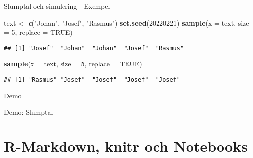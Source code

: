 \documentclass[
  11pt,
  ignorenonframetext,
  handout]{beamer}
\newenvironment{Shaded}{\begin{snugshade}}{\end{snugshade}}
\newcommand{\AttributeTok}[1]{\textcolor[rgb]{0.13,0.29,0.53}{#1}}
\newcommand{\ConstantTok}[1]{\textcolor[rgb]{0.56,0.35,0.01}{#1}}
\newcommand{\DecValTok}[1]{\textcolor[rgb]{0.00,0.00,0.81}{#1}}
\newcommand{\FunctionTok}[1]{\textcolor[rgb]{0.13,0.29,0.53}{\textbf{#1}}}
\newcommand{\NormalTok}[1]{#1}
\newcommand{\OtherTok}[1]{\textcolor[rgb]{0.56,0.35,0.01}{#1}}
\newcommand{\StringTok}[1]{\textcolor[rgb]{0.31,0.60,0.02}{#1}}
\begin{document}
\begin{frame}[fragile]{Slumptal och simulering - Exempel}
\label{slumptal-och-simulering---exempel-1}
\begin{Shaded}
\begin{Highlighting}[]
\NormalTok{text }\OtherTok{\textless{}{-}} \FunctionTok{c}\NormalTok{(}\StringTok{"Johan"}\NormalTok{, }\StringTok{"Josef"}\NormalTok{, }\StringTok{"Rasmus"}\NormalTok{)}
\FunctionTok{set.seed}\NormalTok{(}\DecValTok{20220221}\NormalTok{)}
\FunctionTok{sample}\NormalTok{(}\AttributeTok{x =}\NormalTok{ text, }\AttributeTok{size =} \DecValTok{5}\NormalTok{, }\AttributeTok{replace =} \ConstantTok{TRUE}\NormalTok{)}
\end{Highlighting}
\end{Shaded}

\pause

\begin{verbatim}
## [1] "Josef"  "Johan"  "Johan"  "Josef"  "Rasmus"
\end{verbatim}

\pause

\begin{Shaded}
\begin{Highlighting}[]
\FunctionTok{sample}\NormalTok{(}\AttributeTok{x =}\NormalTok{ text, }\AttributeTok{size =} \DecValTok{5}\NormalTok{, }\AttributeTok{replace =} \ConstantTok{TRUE}\NormalTok{)}
\end{Highlighting}
\end{Shaded}

\pause

\begin{verbatim}
## [1] "Rasmus" "Josef"  "Josef"  "Josef"  "Josef"
\end{verbatim}
\end{frame}

\begin{frame}{Demo}
\label{demo-1}
\begin{block}{Demo: Slumptal}
\label{demo-slumptal}
\end{block}
\end{frame}

\section{R-Markdown, knitr och
Notebooks}\label{r-markdown-knitr-och-notebooks}
\end{document}
